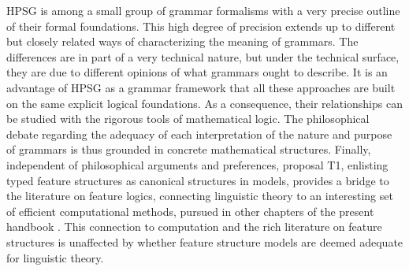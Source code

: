 \documentclass[output=paper
 	        ,biblatex
                ,babelshorthands
                ,newtxmath
                ,draftmode
                ,colorlinks, citecolor=brown
]{langscibook}
\begin{document}
{HPSG is among a small group of grammar formalisms with a very precise
outline of their formal foundations. This high degree of precision
extends up to different but closely related ways of characterizing the
meaning of grammars. The differences are in part of a very technical nature,
but under the technical surface, they are due to different opinions of
what grammars ought to describe. It is an advantage of HPSG as a
grammar framework that all these approaches are built on the same
explicit logical foundations. As a consequence, their relationships can
be studied with the rigorous tools of mathematical logic. The
philosophical debate regarding the adequacy of each interpretation of
the nature and purpose of grammars is thus grounded in concrete
mathematical structures. Finally, independent of 
philosophical arguments and preferences, proposal T1, enlisting typed feature
structures as canonical structures in models, provides a bridge to the
literature on feature logics, connecting linguistic theory to an
interesting set of efficient computational methods, pursued in other
chapters of the present handbook . This connection
to computation and the rich literature on feature structures is unaffected
by whether feature structure models are deemed adequate for linguistic theory.




}


\end{document}
